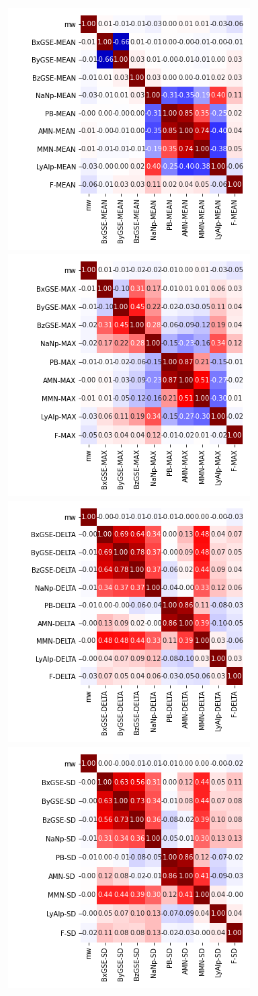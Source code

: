 \documentclass[12pt]{article}
\begin{document}
\newpage

\begin{figure}
   \includegraphics[width=0.57\textwidth]{five-six_mean_2.png}
   \includegraphics[width=0.57\textwidth]{five-six_max_2.png}
   \includegraphics[width=0.57\textwidth]{five-six_delta_2.png}
   \includegraphics[width=0.57\textwidth]{five-six_sd_2.png}
\end{figure}
\end{document}
